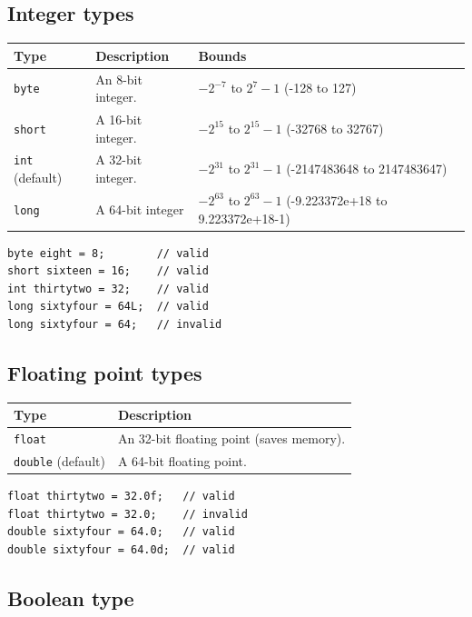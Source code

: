 \documentclass[a4paper]{systems-software}
\begin{document}
\subsection*{Integer types}

\begin{longtabu} to \textwidth {| X[0.4,l] | X[0.4,l] | X[1,l] |}
	\hline
	\textbf{Type} & \textbf{Description} & \textbf{Bounds}
	\\ \hline
	\texttt{byte} & An 8-bit integer. &
	$-2^{-7}$ to $2^{7}-1$ (-128 to 127)
	\\ \hline
	\texttt{short} & A 16-bit integer. &
	$-2^{15}$ to $2^{15}-1$ (-32768 to 32767)
	\\ \hline
	\texttt{int} (default) & A 32-bit integer. &
	$-2^{31}$ to $2^{31}-1$ (-2147483648 to 2147483647)
	\\ \hline
	\texttt{long} & A 64-bit integer &
	$-2^{63}$ to $2^{63}-1$ (-9.223372e+18 to 9.223372e+18-1)
	\\ \hline
\end{longtabu}

\begin{lstlisting}[title={Using integer types.}]
byte eight = 8;        // valid
short sixteen = 16;    // valid
int thirtytwo = 32;    // valid
long sixtyfour = 64L;  // valid
long sixtyfour = 64;   // invalid
\end{lstlisting}


\subsection*{Floating point types}

\begin{longtabu} to \textwidth {| X[0.4,l] | X[1,l] |}
	\hline
	\textbf{Type} & \textbf{Description}
	\\ \hline
	\texttt{float} & An 32-bit floating point (saves memory).
	\\ \hline
	\texttt{double} (default) & A 64-bit floating point.
	\\ \hline
\end{longtabu}

\begin{lstlisting}[title={Using integer types.}]
float thirtytwo = 32.0f;   // valid
float thirtytwo = 32.0;    // invalid
double sixtyfour = 64.0;   // valid
double sixtyfour = 64.0d;  // valid
\end{lstlisting}


\newpage

\subsection*{Boolean type}
\end{document}
